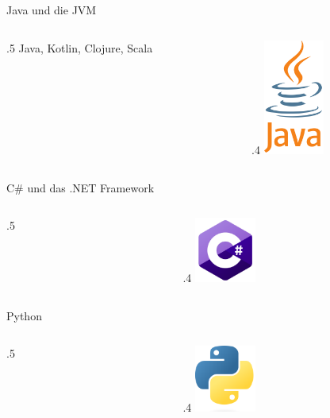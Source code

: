 \begin{frame}{Java und die JVM}
    \begin{columns}
        \begin{column}{.5\framewidth}
            Java, Kotlin, Clojure, Scala
        \end{column}
        \begin{column}{.4\framewidth}
            \includegraphics[width=2cm]{resources/logos/java}
        \end{column}
    \end{columns}
\end{frame}

\begin{frame}{C\# und das .NET Framework}
    \begin{columns}
        \begin{column}{.5\framewidth}

        \end{column}
        \begin{column}{.4\framewidth}
            \includegraphics[width=2cm]{resources/logos/csharp}
        \end{column}
    \end{columns}
\end{frame}

\begin{frame}{Python}
    \begin{columns}
        \begin{column}{.5\framewidth}

        \end{column}
        \begin{column}{.4\framewidth}
            \includegraphics[width=2cm]{resources/logos/python}
        \end{column}
    \end{columns}
\end{frame}